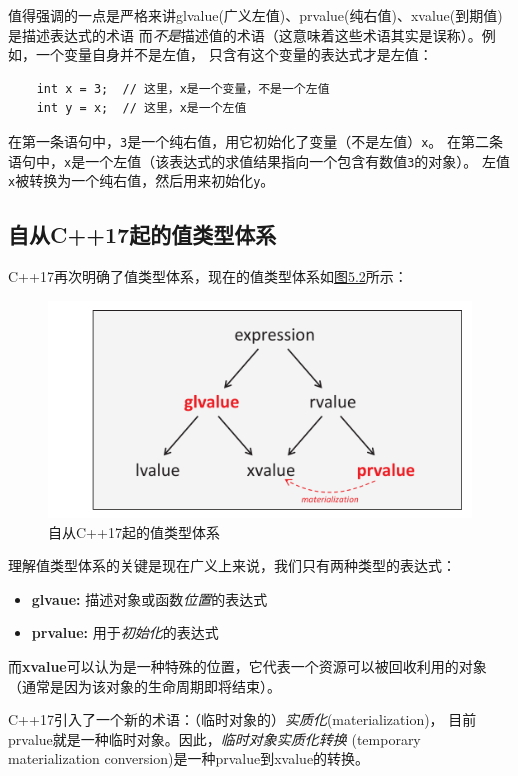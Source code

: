 值得强调的一点是严格来讲glvalue(广义左值)、prvalue(纯右值)、xvalue(到期值)是描述表达式的术语
而\emph{不是}描述值的术语（这意味着这些术语其实是误称）。例如，一个变量自身并不是左值，
只含有这个变量的表达式才是左值：
\begin{lstlisting}
    int x = 3;  // 这里，x是一个变量，不是一个左值
    int y = x;  // 这里，x是一个左值
\end{lstlisting}
在第一条语句中，\texttt{3}是一个纯右值，用它初始化了变量（不是左值）\texttt{x}。
在第二条语句中，\texttt{x}是一个左值（该表达式的求值结果指向一个包含有数值\texttt{3}的对象）。
左值\texttt{x}被转换为一个纯右值，然后用来初始化\texttt{y}。

\subsection{自从C++17起的值类型体系}
C++17再次明确了值类型体系，现在的值类型体系如\hyperref[f5.2]{图5.2}所示：

\begin{figure}[ht]
    \begin{center}
        \includegraphics[scale=0.8]{../imgs/05.2.png}
        \caption{自从C++17起的值类型体系}
        \label{f5.2}
    \end{center}
\end{figure}

理解值类型体系的关键是现在广义上来说，我们只有两种类型的表达式：
\begin{itemize}
    \item \textbf{glvaue:} 描述对象或函数\emph{位置}的表达式
    \item \textbf{prvalue:} 用于\emph{初始化}的表达式
\end{itemize}
而\textbf{xvalue}可以认为是一种特殊的位置，它代表一个资源可以被回收利用的对象
（通常是因为该对象的生命周期即将结束）。

C++17引入了一个新的术语：（临时对象的）\emph{实质化}(materialization)，
目前prvalue就是一种临时对象。因此，\emph{临时对象实质化转换}
(temporary materialization conversion)是一种prvalue到xvalue的转换。

